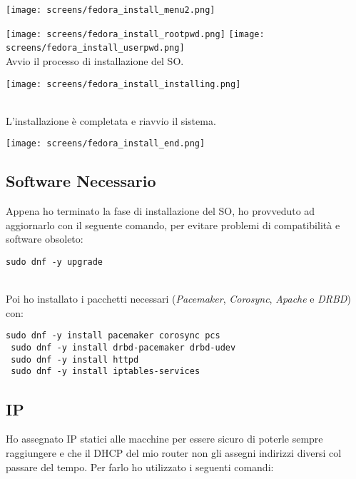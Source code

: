 \begin{center}
	\texttt{[image: screens/fedora\_install\_menu2.png]}
\end{center}

\texttt{[image: screens/fedora\_install\_rootpwd.png]}
\texttt{[image: screens/fedora\_install\_userpwd.png]}
\ \\
Avvio il processo di installazione del SO.

\begin{center}
	\texttt{[image: screens/fedora\_install\_installing.png]}
\end{center}
\ \\
L'installazione \`{e} completata e riavvio il sistema.

\begin{center}
	\texttt{[image: screens/fedora\_install\_end.png]}
\end{center}

\subsection{Software Necessario}

Appena ho terminato la fase di installazione del SO, ho provveduto ad aggiornarlo con il seguente comando, per evitare problemi di compatibilit\`{a} e software obsoleto:

\begin{lstlisting}[style=cmd]
 sudo dnf -y upgrade
\end{lstlisting} 
\ \\
Poi ho installato i pacchetti necessari (\textit{Pacemaker}, \textit{Corosync}, \textit{Apache} e \textit{DRBD}) con: 

\begin{lstlisting}[style=cmd]
 sudo dnf -y install pacemaker corosync pcs
 sudo dnf -y install drbd-pacemaker drbd-udev
 sudo dnf -y install httpd
 sudo dnf -y install iptables-services
\end{lstlisting} 
\pagebreak
\subsection{IP}

Ho assegnato IP statici alle macchine per essere sicuro di poterle sempre raggiungere e che il DHCP del mio router non gli assegni indirizzi diversi col passare del tempo. Per farlo ho utilizzato i seguenti comandi:

